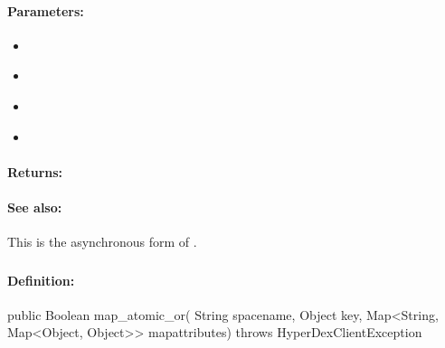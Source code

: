 \paragraph{Parameters:}
\begin{itemize}[noitemsep]
\item {}\\

\item {}\\

\item {}\\

\item {}\\

\end{itemize}

\paragraph{Returns:}


\paragraph{See also:}  This is the asynchronous form of .

\pagebreak
\subsubsection{}
\label{api:java:map_atomic_or}


\paragraph{Definition:}
\begin{javacode}
public Boolean map_atomic_or(
        String spacename,
        Object key,
        Map<String, Map<Object, Object>> mapattributes) throws HyperDexClientException
\end{javacode}

